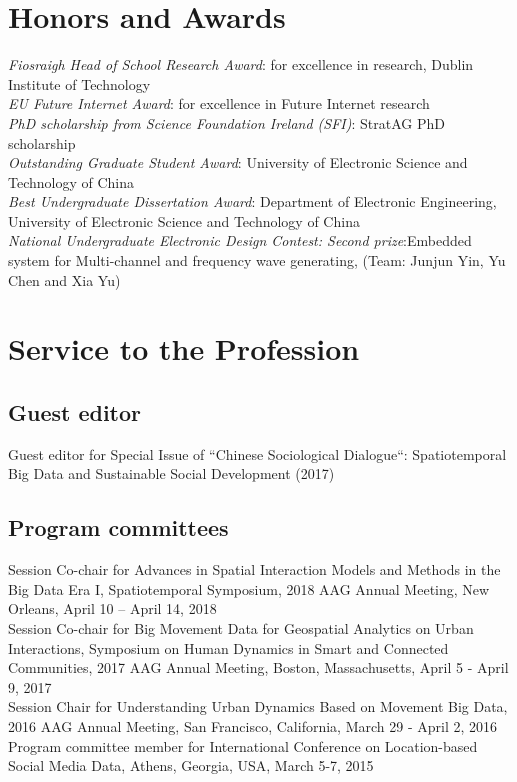 \documentclass[11pt, a4paper]{article}
\newcommand{\years}[1]{\marginnote{\scriptsize #1}}
\begin{document}
\section*{Honors and Awards}
\noindent
\years{2013}\emph{Fiosraigh Head of School Research Award}: for excellence in research, Dublin Institute of Technology\\
\years{2013}\emph{EU Future Internet Award}: for excellence in Future Internet research\\
\years{2009}\emph{PhD scholarship from Science Foundation Ireland (SFI)}: StratAG PhD scholarship\\
\years{2006}\emph{Outstanding Graduate Student Award}: University of Electronic Science and Technology of China\\
\years{2006}\emph{Best Undergraduate Dissertation Award}: Department of Electronic Engineering, University of Electronic Science and Technology of China\\
\years{2005}\emph{National Undergraduate Electronic Design Contest: Second prize}:Embedded system for Multi-channel and frequency wave generating, (Team: Junjun Yin, Yu Chen and Xia Yu)

\section*{Service to the Profession}
\subsection*{Guest editor}
Guest editor for Special Issue of ``Chinese Sociological Dialogue``: Spatiotemporal Big Data and Sustainable Social Development (2017)
\subsection*{Program committees}
Session Co-chair for Advances in Spatial Interaction Models and Methods in the Big Data Era I, Spatiotemporal Symposium, 2018 AAG Annual Meeting, New Orleans, April 10 – April 14, 2018\\
Session Co-chair for Big Movement Data for Geospatial Analytics on Urban Interactions, Symposium on Human Dynamics in Smart and Connected Communities, 2017 AAG Annual Meeting, Boston, Massachusetts, April 5 - April 9, 2017\\
Session Chair for Understanding Urban Dynamics Based on Movement Big Data, 2016 AAG Annual Meeting, San Francisco, California, March 29 - April 2, 2016\\
Program committee member for International Conference on Location-based Social Media Data, Athens, Georgia, USA, March 5-7, 2015
\end{document}
